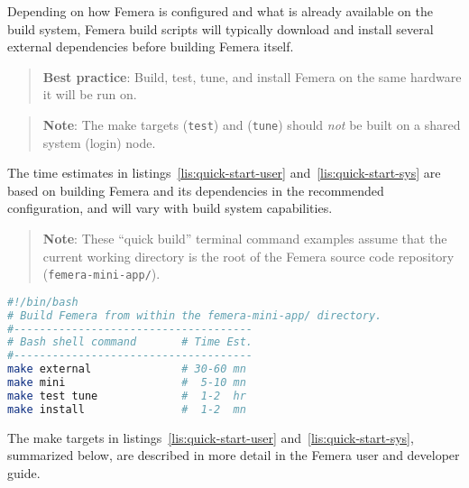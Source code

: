 Depending on how Femera is configured and what is already available
on the build system, Femera build scripts will typically download
and install several external dependencies before building Femera itself.
\begin{verse}
\textbf{Best practice}:
Build, test, tune, and install Femera on the same hardware it will be run on.
\end{verse}
\begin{comment}
tdd:tests/post-build/make\_test\_did\_check\_runtime\_fmrmodel.py
\end{comment}
\begin{verse}
\textbf{Note}:
The make targets (\texttt{test}) and (\texttt{tune})
should \textit{not} be built on a shared system (login) node.
\end{verse}
The time estimates in listings~\ref{lis:quick-start-user}
and~\ref{lis:quick-start-sys} are based
on building Femera and its dependencies in the recommended configuration,
and will vary with build system capabilities.
\begin{comment}
tdd:tests/pre-build/sys\_has\_fewer\_than\_5\_users.py
\end{comment}
\begin{verse}
\textbf{Note}:
These ``quick build'' terminal command examples
assume that the current working directory is the root of the
Femera source code repository (\texttt{femera-mini-app/}).
\end{verse}

\begin{center}
\begin{lstlisting}[caption={Build and install Femera in a user directory.},
label={lis:quick-start-user},language=bash,float=ht]
#!/bin/bash
# Build Femera from within the femera-mini-app/ directory.
#-------------------------------------
# Bash shell command       # Time Est.
#-------------------------------------
make external              # 30-60 mn
make mini                  #  5-10 mn
make test tune             #  1-2  hr
make install               #  1-2  mn
\end{lstlisting}
\begin{comment}
tdd:tests/post-build/make\_time\_in\_user\_guide\_is\_correct.py
\end{comment}
\end{center}

The make targets in
listings~\ref{lis:quick-start-user} and~\ref{lis:quick-start-sys},
summarized below, are described in more detail in
the Femera user and developer guide.

